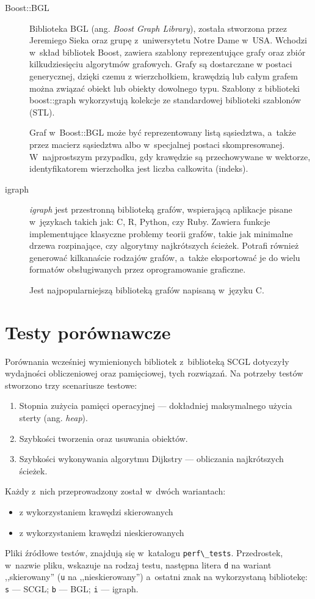 \documentclass[a4paper,12pt,polish,oneside]{thesis}
\newcommand\code[1]{\lstinline[style=line]{#1}}
\begin{document}
\begin{description}
\item[Boost::BGL]
Biblioteka BGL (ang. \emph{Boost Graph Library}), została stworzona przez Jeremiego Sieka oraz grupę z~uniwersytetu Notre Dame w~USA.
Wchodzi w~skład bibliotek Boost, zawiera szablony reprezentujące grafy oraz zbiór kilkudziesięciu algorytmów grafowych.
Grafy są dostarczane w postaci generycznej, dzięki czemu z wierzchołkiem, krawędzią lub całym grafem można związać obiekt lub obiekty dowolnego typu.
Szablony z biblioteki boost::graph wykorzystują kolekcje ze standardowej biblioteki szablonów (STL).

Graf w~Boost::BGL może być reprezentowany listą sąsiedztwa, a~także przez macierz sąsiedztwa albo w~specjalnej postaci skompresowanej.
W~najprostszym przypadku, gdy krawędzie są przechowywane w wektorze, identyfikatorem wierzchołka jest liczba całkowita (indeks).

\item[igraph]
\emph{igraph} jest przestronną biblioteką grafów, wspierającą aplikacje pisane w~językach takich jak: C, R, Python, czy Ruby.
Zawiera funkcje implementujące klasyczne problemy teorii grafów, takie jak minimalne drzewa rozpinające, czy algorytmy najkrótszych ścieżek.
Potrafi również generować kilkanaście rodzajów grafów, a~także eksportować je do wielu formatów obsługiwanych przez oprogramowanie graficzne.

Jest najpopularniejszą biblioteką grafów napisaną w~języku C.
\end{description}

\section{Testy porównawcze}
Porównania wcześniej wymienionych bibliotek z~biblioteką SCGL dotyczyły wydajności obliczeniowej oraz pamięciowej, tych rozwiązań.
Na potrzeby testów stworzono trzy scenariusze testowe:
\begin{enumerate}
	\item Stopnia zużycia pamięci operacyjnej --- dokładniej maksymalnego użycia sterty (ang. \emph{heap}).
	\item Szybkości tworzenia oraz usuwania obiektów.
	\item Szybkości wykonywania algorytmu Dijkstry --- obliczania najkrótszych ścieżek.
\end{enumerate}
Każdy z~nich przeprowadzony został w~dwóch wariantach:
\begin{itemize}
	\item z wykorzystaniem krawędzi skierowanych
	\item z wykorzystaniem krawędzi nieskierowanych
\end{itemize}
Pliki źródłowe testów, znajdują się w~katalogu \code{perf\_tests}.
Przedrostek, w~nazwie pliku, wskazuje na rodzaj testu, następna litera \code{d} na wariant ,,skierowany'' (\code{u} na ,,nieskierowany'') a~ostatni znak na wykorzystaną bibliotekę: \code{s} --- SCGL; \code{b} --- BGL; \code{i} --- igraph.
\end{document}
